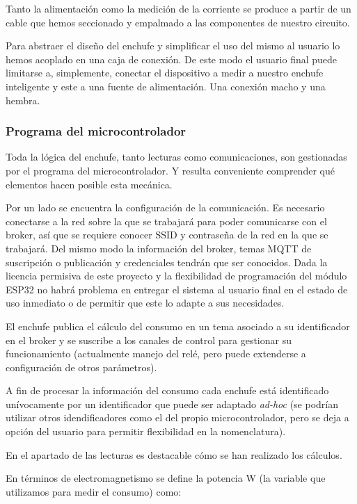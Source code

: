 \documentclass[a4paper,10pt]{article}
\begin{document}
Tanto la alimentación como la medición de la corriente se produce a
partir de un cable que hemos seccionado y empalmado a las componentes
de nuestro circuito.

Para abstraer el diseño del enchufe y simplificar el uso del mismo al
usuario lo hemos acoplado en una caja de conexión. De este modo el
usuario final puede limitarse a, simplemente, conectar el dispositivo
a medir a nuestro enchufe inteligente y este a una fuente de
alimentación. Una conexión macho y una hembra.

\subsubsection{Programa del microcontrolador}

Toda la lógica del enchufe, tanto lecturas como comunicaciones, son
gestionadas por el programa del microcontrolador. Y resulta conveniente
comprender qué elementos hacen posible esta mecánica.

Por un lado se encuentra la configuración de la comunicación. Es
necesario conectarse a la red sobre la que se trabajará para poder
comunicarse con el broker, así que se requiere conocer SSID y
contraseña de la red en la que se trabajará. Del mismo modo la
información del broker, temas MQTT de suscripción o publicación y
credenciales tendrán que ser conocidos. Dada la licencia permisiva de
este proyecto y la flexibilidad de programación del módulo ESP32 no
habrá problema en entregar el sistema al usuario final en el estado de
uso inmediato o de permitir que este lo adapte a sus necesidades.

El enchufe publica el cálculo del consumo en un tema asociado a su
identificador en el broker y se suscribe a los canales de control para
gestionar su funcionamiento (actualmente manejo del relé, pero puede
extenderse a configuración de otros parámetros).

A fin de procesar la información del consumo cada enchufe está
identificado unívocamente por un identificador que puede ser adaptado
\textit{ad-hoc} (se podrían utilizar otros idendificadores como el del propio
microcontrolador, pero se deja a opción del usuario para permitir
flexibilidad en la nomenclatura).

En el apartado de las lecturas es destacable cómo se han realizado los
cálculos.

En términos de electromagnetismo se define la potencia W (la variable
que utilizamos para medir el consumo) como:
\end{document}
